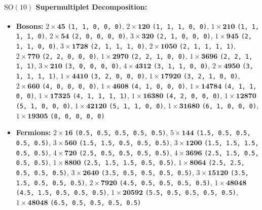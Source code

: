 \documentclass[11pt,a4paper]{article}
\begin{document}
\paragraph{$\mathrm{SO}(10)$ Supermultiplet Decomposition:}
\begin{itemize}
    \item \textbf{Bosons:} $2 \times \mathbf{45}$ \texttt{(1, 1, 0, 0, 0)}, $2 \times \mathbf{120}$ \texttt{(1, 1, 1, 0, 0)}, $1 \times \mathbf{210}$ \texttt{(1, 1, 1, 1, 0)}, $2 \times \mathbf{54}$ \texttt{(2, 0, 0, 0, 0)}, $3 \times \mathbf{320}$ \texttt{(2, 1, 0, 0, 0)}, $1 \times \mathbf{945}$ \texttt{(2, 1, 1, 0, 0)}, $3 \times \mathbf{1728}$ \texttt{(2, 1, 1, 1, 0)}, $2 \times \mathbf{1050}$ \texttt{(2, 1, 1, 1, 1)}, $2 \times \mathbf{770}$ \texttt{(2, 2, 0, 0, 0)}, $1 \times \mathbf{2970}$ \texttt{(2, 2, 1, 0, 0)}, $1 \times \mathbf{3696}$ \texttt{(2, 2, 1, 1, 1)}, $3 \times \mathbf{210}$ \texttt{(3, 0, 0, 0, 0)}, $4 \times \mathbf{4312}$ \texttt{(3, 1, 1, 0, 0)}, $2 \times \mathbf{4950}$ \texttt{(3, 1, 1, 1, 1)}, $1 \times \mathbf{4410}$ \texttt{(3, 2, 0, 0, 0)}, $1 \times \mathbf{17920}$ \texttt{(3, 2, 1, 0, 0)}, $2 \times \mathbf{660}$ \texttt{(4, 0, 0, 0, 0)}, $1 \times \mathbf{4608}$ \texttt{(4, 1, 0, 0, 0)}, $1 \times \mathbf{14784}$ \texttt{(4, 1, 1, 0, 0)}, $1 \times \mathbf{17325}$ \texttt{(4, 1, 1, 1, 1)}, $1 \times \mathbf{16380}$ \texttt{(4, 2, 0, 0, 0)}, $1 \times \mathbf{12870}$ \texttt{(5, 1, 0, 0, 0)}, $1 \times \mathbf{42120}$ \texttt{(5, 1, 1, 0, 0)}, $1 \times \mathbf{31680}$ \texttt{(6, 1, 0, 0, 0)}, $1 \times \mathbf{19305}$ \texttt{(8, 0, 0, 0, 0)}
    \item \textbf{Fermions:} $2 \times \mathbf{16}$ \texttt{(0.5, 0.5, 0.5, 0.5, 0.5)}, $5 \times \mathbf{144}$ \texttt{(1.5, 0.5, 0.5, 0.5, 0.5)}, $3 \times \mathbf{560}$ \texttt{(1.5, 1.5, 0.5, 0.5, 0.5)}, $3 \times \mathbf{1200}$ \texttt{(1.5, 1.5, 1.5, 0.5, 0.5)}, $4 \times \mathbf{720}$ \texttt{(2.5, 0.5, 0.5, 0.5, 0.5)}, $4 \times \mathbf{3696}$ \texttt{(2.5, 1.5, 0.5, 0.5, 0.5)}, $1 \times \mathbf{8800}$ \texttt{(2.5, 1.5, 1.5, 0.5, 0.5)}, $1 \times \mathbf{8064}$ \texttt{(2.5, 2.5, 0.5, 0.5, 0.5)}, $3 \times \mathbf{2640}$ \texttt{(3.5, 0.5, 0.5, 0.5, 0.5)}, $3 \times \mathbf{15120}$ \texttt{(3.5, 1.5, 0.5, 0.5, 0.5)}, $2 \times \mathbf{7920}$ \texttt{(4.5, 0.5, 0.5, 0.5, 0.5)}, $1 \times \mathbf{48048}$ \texttt{(4.5, 1.5, 0.5, 0.5, 0.5)}, $1 \times \mathbf{20592}$ \texttt{(5.5, 0.5, 0.5, 0.5, 0.5)}, $1 \times \mathbf{48048}$ \texttt{(6.5, 0.5, 0.5, 0.5, 0.5)}
\end{itemize}
\end{document}
